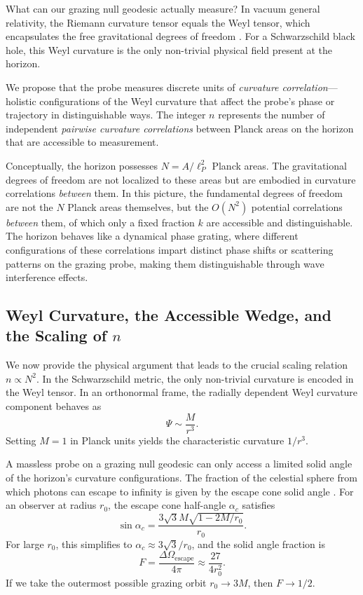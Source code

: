 \documentclass[12pt, letterpaper]{article}
\begin{document}
What can our grazing null geodesic actually measure? In vacuum general relativity, the Riemann curvature tensor equals the Weyl tensor, which encapsulates the free gravitational degrees of freedom \cite{MTW1973}. For a Schwarzschild black hole, this Weyl curvature is the only non-trivial physical field present at the horizon.

We propose that the probe measures discrete units of \emph{curvature correlation}—holistic configurations of the Weyl curvature that affect the probe's phase or trajectory in distinguishable ways. The integer $n$ represents the number of independent \emph{pairwise curvature correlations} between Planck areas on the horizon that are accessible to measurement.

Conceptually, the horizon possesses $N = A/\ell_P^2$ Planck areas. The gravitational degrees of freedom are not localized to these areas but are embodied in curvature correlations \emph{between} them. In this picture, the fundamental degrees of freedom are not the $N$ Planck areas themselves, but the $O(N^2)$ potential correlations \emph{between} them, of which only a fixed fraction $k$ are accessible and distinguishable. The horizon behaves like a dynamical phase grating, where different configurations of these correlations impart distinct phase shifts or scattering patterns on the grazing probe, making them distinguishable through wave interference effects.

\subsection{Weyl Curvature, the Accessible Wedge, and the Scaling of \( n \)}

We now provide the physical argument that leads to the crucial scaling relation $n \propto N^2$. In the Schwarzschild metric, the only non-trivial curvature is encoded in the Weyl tensor. In an orthonormal frame, the radially dependent Weyl curvature component behaves as
\[
\Psi \sim \frac{M}{r^3}.
\]
Setting $M=1$ in Planck units yields the characteristic curvature $1/r^3$.

A massless probe on a grazing null geodesic can only access a limited solid angle of the horizon's curvature configurations. The fraction of the celestial sphere from which photons can escape to infinity is given by the escape cone solid angle \cite{MTW1973}. For an observer at radius $r_0$, the escape cone half-angle $\alpha_c$ satisfies
\[
\sin \alpha_c = \frac{3\sqrt{3}M \sqrt{1 - 2M/r_0}}{r_0}.
\]
For large $r_0$, this simplifies to $\alpha_c \approx 3\sqrt{3}/r_0$, and the solid angle fraction is
\[
F = \frac{\Delta\Omega_{\text{escape}}}{4\pi} \approx \frac{27}{4 r_0^2}.
\]
If we take the outermost possible grazing orbit $r_0 \to 3M$, then $F \to 1/2$.
\end{document}
